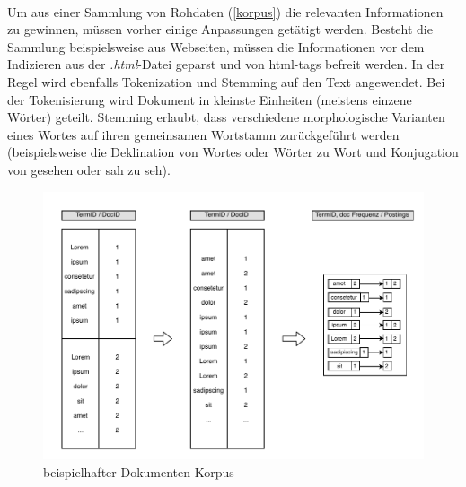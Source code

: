 \paragraph{}
Um aus einer Sammlung von Rohdaten (\ref{korpus}) die relevanten Informationen zu gewinnen, müssen vorher einige Anpassungen getätigt werden. Besteht die Sammlung beispielsweise aus Webseiten, müssen die Informationen vor dem Indizieren aus der \textit{.html}-Datei geparst und von html-tags befreit werden. In der Regel wird ebenfalls Tokenization und Stemming auf den Text angewendet. Bei der Tokenisierung wird Dokument in kleinste Einheiten (meistens einzene Wörter) geteilt. Stemming erlaubt, dass verschiedene morphologische Varianten eines Wortes auf ihren gemeinsamen Wortstamm zurückgeführt werden (beispielsweise die Deklination von Wortes oder Wörter zu Wort und Konjugation von gesehen oder sah zu seh).
\par
\begin{figure}
  \includegraphics[width=\textwidth]{pdf/postingslist3.pdf}
  \caption{beispielhafter Dokumenten-Korpus}
\end{figure}

